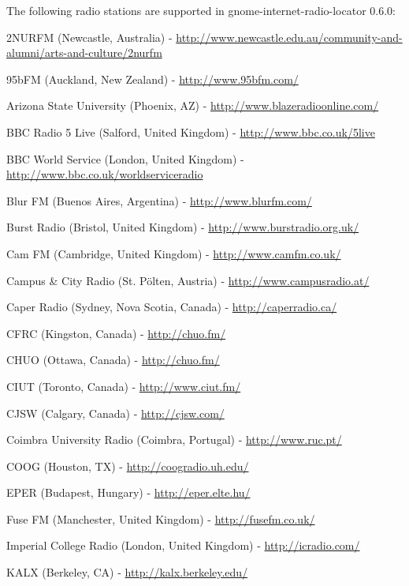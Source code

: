 \documentclass[20pt,landscape]{foils}
\begin{document}

The following radio stations are supported in gnome-internet-radio-locator 0.6.0:

\begin{list1}
\item
  \begin{list2}
  \item 2NURFM (Newcastle, Australia) - \url{http://www.newcastle.edu.au/community-and-alumni/arts-and-culture/2nurfm}
  \item 95bFM (Auckland, New Zealand) - \url{http://www.95bfm.com/}
  \item Arizona State University (Phoenix, AZ) - \url{http://www.blazeradioonline.com/}
  \item BBC Radio 5 Live (Salford, United Kingdom) - \url{http://www.bbc.co.uk/5live}
  \item BBC World Service (London, United Kingdom) - \url{http://www.bbc.co.uk/worldserviceradio}
  \item Blur FM (Buenos Aires, Argentina) - \url{http://www.blurfm.com/}
  \item Burst Radio (Bristol, United Kingdom) - \url{http://www.burstradio.org.uk/}
  \item Cam FM (Cambridge, United Kingdom) - \url{http://www.camfm.co.uk/}
  \item Campus \& City Radio (St. Pölten, Austria) - \url{http://www.campusradio.at/}
  \item Caper Radio (Sydney, Nova Scotia, Canada) - \url{http://caperradio.ca/}
  \item CFRC (Kingston, Canada) - \url{http://chuo.fm/}
  \item CHUO (Ottawa, Canada) - \url{http://chuo.fm/}
  \item CIUT (Toronto, Canada) - \url{http://www.ciut.fm/}
  \item CJSW (Calgary, Canada) - \url{http://cjsw.com/}
  \item Coimbra University Radio (Coimbra, Portugal) - \url{http://www.ruc.pt/}
  \item COOG (Houston, TX) - \url{http://coogradio.uh.edu/}
  \item EPER (Budapest, Hungary) - \url{http://eper.elte.hu/}
  \item Fuse FM (Manchester, United Kingdom) - \url{http://fusefm.co.uk/}
  \item Imperial College Radio (London, United Kingdom) - \url{http://icradio.com/}
  \item KALX (Berkeley, CA) - \url{http://kalx.berkeley.edu/}

\end{list2}
\end{list1}
\end{document}
